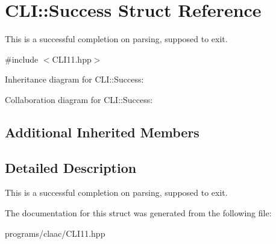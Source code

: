 \hypertarget{struct_c_l_i_1_1_success}{}\section{C\+LI\+:\+:Success Struct Reference}
\label{struct_c_l_i_1_1_success}


This is a successful completion on parsing, supposed to exit.  




{\ttfamily \#include $<$C\+L\+I11.\+hpp$>$}



Inheritance diagram for C\+LI\+:\+:Success\+:


Collaboration diagram for C\+LI\+:\+:Success\+:
\subsection*{Additional Inherited Members}


\subsection{Detailed Description}
This is a successful completion on parsing, supposed to exit. 

The documentation for this struct was generated from the following file\+:\begin{DoxyCompactItemize}
\item 
programs/claac/C\+L\+I11.\+hpp\end{DoxyCompactItemize}

